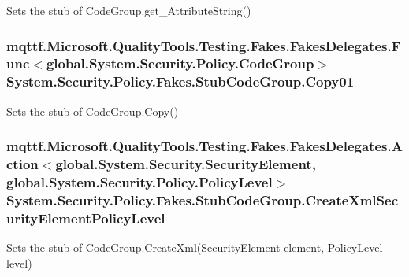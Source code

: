 Sets the stub of Code\-Group.\-get\-\_\-\-Attribute\-String()

\hypertarget{class_system_1_1_security_1_1_policy_1_1_fakes_1_1_stub_code_group_a3a49345363b819a16ffb037c4a7b25ca}{
\subsubsection[{Copy01}]{\setlength{\rightskip}{0pt plus 5cm}mqttf.\-Microsoft.\-Quality\-Tools.\-Testing.\-Fakes.\-Fakes\-Delegates.\-Func$<$global.\-System.\-Security.\-Policy.\-Code\-Group$>$ System.\-Security.\-Policy.\-Fakes.\-Stub\-Code\-Group.\-Copy01}}\label{class_system_1_1_security_1_1_policy_1_1_fakes_1_1_stub_code_group_a3a49345363b819a16ffb037c4a7b25ca}


Sets the stub of Code\-Group.\-Copy()

\hypertarget{class_system_1_1_security_1_1_policy_1_1_fakes_1_1_stub_code_group_a3b63b21578ab18e58c8c3b5360dbcaeb}{
\subsubsection[{Create\-Xml\-Security\-Element\-Policy\-Level}]{\setlength{\rightskip}{0pt plus 5cm}mqttf.\-Microsoft.\-Quality\-Tools.\-Testing.\-Fakes.\-Fakes\-Delegates.\-Action$<$global.\-System.\-Security.\-Security\-Element, global.\-System.\-Security.\-Policy.\-Policy\-Level$>$ System.\-Security.\-Policy.\-Fakes.\-Stub\-Code\-Group.\-Create\-Xml\-Security\-Element\-Policy\-Level}}\label{class_system_1_1_security_1_1_policy_1_1_fakes_1_1_stub_code_group_a3b63b21578ab18e58c8c3b5360dbcaeb}


Sets the stub of Code\-Group.\-Create\-Xml(\-Security\-Element element, Policy\-Level level)

